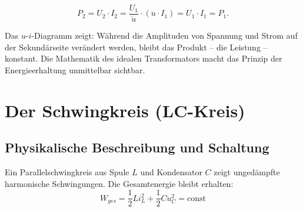 ﻿\documentclass[12pt, a4paper]{article}
\begin{document}
	\begin{equation}
		P_2 = U_2 \cdot I_2 = \frac{U_1}{\ddot{u}} \cdot (\ddot{u} \cdot I_1) = U_1 \cdot I_1 = P_1.
	\end{equation}
	
	Das $u$-$i$-Diagramm zeigt: Während die Amplituden von Spannung und Strom auf der Sekundärseite verändert werden, bleibt das Produkt -- die Leistung -- konstant. Die Mathematik des idealen Transformators macht das Prinzip der Energieerhaltung unmittelbar sichtbar.
	
	\section{Der Schwingkreis (LC-Kreis)}
	
	\subsection{Physikalische Beschreibung und Schaltung}
	
	Ein Parallelschwingkreis aus Spule $L$ und Kondensator $C$ zeigt ungedämpfte harmonische Schwingungen. Die Gesamtenergie bleibt erhalten:
	\begin{equation}
		W_{ges} = \frac{1}{2}L i_L^2 + \frac{1}{2}C u_C^2 = \text{const}
	\end{equation}
	
\end{document}
